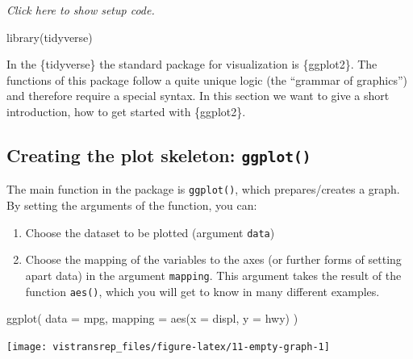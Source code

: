 \documentclass[]{book}
\newenvironment{Shaded}{}{}
\newcommand{\DataTypeTok}[1]{#1}
\newcommand{\KeywordTok}[1]{\textcolor[rgb]{0.00,0.00,1.00}{#1}}
\newcommand{\NormalTok}[1]{#1}
\providecommand{\tightlist}{%
  \setlength{\itemsep}{0pt}\setlength{\parskip}{0pt}}
\begin{document}
\emph{Click here to show setup code.}

\begin{Shaded}
\begin{Highlighting}[]
\KeywordTok{library}\NormalTok{(tidyverse)}
\end{Highlighting}
\end{Shaded}

In the \{tidyverse\} the standard package for visualization is \{ggplot2\}.
The functions of this package follow a quite unique logic (the ``grammar of graphics'') and therefore require a special syntax.
In this section we want to give a short introduction, how to get started with \{ggplot2\}.

\hypertarget{creating-the-plot-skeleton-ggplot}{%
\subsection{\texorpdfstring{Creating the plot skeleton: \texttt{ggplot()}}{Creating the plot skeleton: ggplot()}}\label{creating-the-plot-skeleton-ggplot}}

The main function in the package is \texttt{ggplot()}, which prepares/creates a graph.
By setting the arguments of the function, you can:

\begin{enumerate}
\def\labelenumi{\arabic{enumi}.}
\tightlist
\item
  Choose the dataset to be plotted (argument \texttt{data})
\item
  Choose the mapping of the variables to the axes (or further forms of setting apart data) in the argument \texttt{mapping}.
  This argument takes the result of the function \texttt{aes()}, which you will get to know in many different examples.
\end{enumerate}

\begin{Shaded}
\begin{Highlighting}[]
\KeywordTok{ggplot}\NormalTok{(}
  \DataTypeTok{data =}\NormalTok{ mpg,}
  \DataTypeTok{mapping =} \KeywordTok{aes}\NormalTok{(}\DataTypeTok{x =}\NormalTok{ displ, }\DataTypeTok{y =}\NormalTok{ hwy)}
\NormalTok{)}
\end{Highlighting}
\end{Shaded}

\begin{flushright}\texttt{[image: vistransrep\_files/figure-latex/11-empty-graph-1]} \end{flushright}
\end{document}
